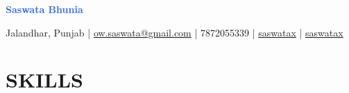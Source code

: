 \documentclass[]{resume}
\begin{document}
\textrm{\Huge\textcolor{highlight}{\textbf{Saswata Bhunia}}}
\vspace{.4em}

Jalandhar, Punjab | \href{mailto:ow.saswata@gmail.com}{ow.saswata@gmail.com} | 7872055339 | \href{https://www.linkedin.com/in/saswatax}{\faLinkedin \space saswatax} | \href{https://github.com/saswatax}{\faGithub \space saswatax}
\vspace{.4em}


\section{SKILLS}
\end{document}
